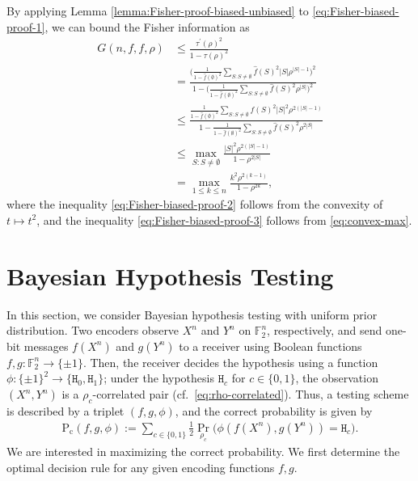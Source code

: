 \documentclass[journal,draftcls, onecolumn]{IEEEtran}
\newcommand{\qed}{\hfill \IEEEQED}
\newcommand{\rom}[1]{\mathrm{#1}}
\newcommand{\Pc}{\rom{P}_{\rom{c}}}
\begin{document}
By applying Lemma \ref{lemma:Fisher-proof-biased-unbiased} to \eqref{eq:Fisher-biased-proof-1}, we can bound the Fisher information as
\begin{align}
G(n,f,f,\rho) &\le \frac{\tau^\prime(\rho)^2}{1-\tau(\rho)^2} \\
&= \frac{\bigg( \frac{1}{1-\widehat{f}(\emptyset)^2} \sum_{S: S \neq \emptyset} \widehat{f}(S)^2 |S| \rho^{|S|-1} \bigg)^2}{1 - \bigg(\frac{1}{1- \widehat{f}(\emptyset)^2} \sum_{S: S \neq \emptyset} \widehat{f}(S)^2 \rho^{|S|} \bigg)^2} \\
&\le \frac{\frac{1}{1-\widehat{f}(\emptyset)^2} \sum_{S: S \neq \emptyset} \widehat{f}(S)^2 |S|^2 \rho^{2(|S|-1)}}{1 - \frac{1}{1- \widehat{f}(\emptyset)^2} \sum_{S: S \neq \emptyset} \widehat{f}(S)^2 \rho^{2 |S|} } \label{eq:Fisher-biased-proof-2} \\
&\le \max_{S : S \neq \emptyset} \frac{|S|^2 \rho^{2(|S|-1)}}{1-\rho^{2 |S|} } \label{eq:Fisher-biased-proof-3} \\
&=\max_{1\le k\le n} \frac{k^2 \rho^{2(k-1)}}{1-\rho^{2k}},
\end{align}
where the inequality \eqref{eq:Fisher-biased-proof-2} follows from the convexity of $t \mapsto t^2$, 
and the inequality \eqref{eq:Fisher-biased-proof-3} follows from \eqref{eq:convex-max}. \qed




\section{Bayesian Hypothesis Testing}
\label{section:Bayes}




In this section, we consider Bayesian hypothesis testing with uniform prior distribution.
Two encoders observe $X^n$ and $Y^n$ on $\mathbb{F}_2^n$, respectively, and send one-bit messages 
$f(X^n)$ and $g(Y^n)$ to a receiver using Boolean functions $f,g:\mathbb{F}_2^n\to \{\pm 1\}$.
Then, the receiver decides the hypothesis using a function $\phi:\{\pm 1\}^2 \to \{\mathtt{H}_0,\mathtt{H}_1\}$;
under the hypothesis $\mathtt{H}_c$ for $c\in \{0,1\}$, the observation $(X^n,Y^n)$
is a $\rho_c$-correlated pair (cf.~\eqref{eq:rho-correlated}). Thus, a testing scheme is described by a triplet $(f,g,\phi)$,
and the correct probability is given by
\begin{align} \label{eq:correct-probability-Bayesian}
\Pc(f,g,\phi) := \sum_{c\in \{0,1\}} \frac{1}{2} \Pr_{\rho_c}\big( \phi(f(X^n),g(Y^n)) = \mathtt{H}_c \big).
\end{align}
We are interested in maximizing the correct probability. We first  determine the optimal decision rule for any given encoding functions $f,g$. 
\end{document}
